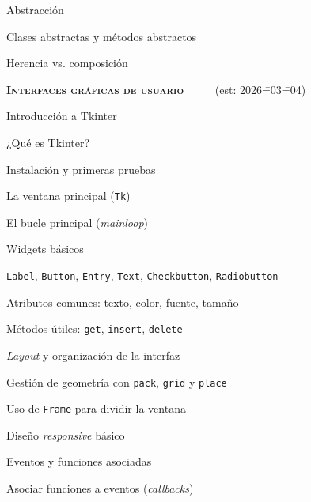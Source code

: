 \begin{longenum}
\begin{longenum}
        \item Abstracción
        \begin{longenum}
            \item Clases abstractas y métodos abstractos
        \end{longenum}
        \item Herencia vs. composición
    \end{longenum}
    \item \textbf{\textsc{Interfaces gráficas de usuario}} \ \ \ \ \ (est: 2026\==03\==04)
    \begin{longenum}
        \item Introducción a Tkinter
        \begin{longenum}
            \item ¿Qué es Tkinter?
            \item Instalación y primeras pruebas
            \item La ventana principal (\texttt{Tk})
            \item El bucle principal (\textit{mainloop})
        \end{longenum}
        \item Widgets básicos
        \begin{longenum}
            \item \texttt{Label}, \texttt{Button}, \texttt{Entry}, \texttt{Text}, \texttt{Checkbutton}, \texttt{Radiobutton}
            \item Atributos comunes: texto, color, fuente, tamaño
            \item Métodos útiles: \texttt{get}, \texttt{insert}, \texttt{delete}
        \end{longenum}
        \item \textit{Layout} y organización de la interfaz
        \begin{longenum}
            \item Gestión de geometría con \texttt{pack}, \texttt{grid} y \texttt{place}
            \item Uso de \texttt{Frame} para dividir la ventana
            \item Diseño \textit{responsive} básico
        \end{longenum}
        \item Eventos y funciones asociadas
        \begin{longenum}
            \item Asociar funciones a eventos (\textit{callbacks})

\end{longenum}
\end{longenum}
\end{longenum}
